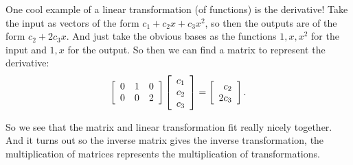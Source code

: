\begin{example}
  One cool example of a linear transformation (of functions) is the derivative! Take the input as vectors of the form $c_1 + c_2x + c_3x^2$, so then the outputs are of the form $c_2 + 2c_3x$. And just take the obvious bases as the functions $1,x,x^2$ for the input and $1,x$ for the output. So then we can find a matrix to represent the derivative:
\[ \left[ \begin{array}{rrrrrrrrrrrrrrrrrrrrrrrrr} 0&1&0\\0&0&2\\ \end{array} \right]\left[ \begin{array}{rrrrrrrrrrrrrrrrrrrrrrrrr} c_1\\c_2\\c_3\\ \end{array} \right] = \left[ \begin{array}{rrrrrrrrrrrrrrrrrrrrrrrrr} c_2\\2c_3\\ \end{array} \right]. \]
\end{example}

So we see that the matrix and linear transformation fit really nicely together. And it turns out so the inverse matrix gives the inverse transformation, the multiplication of matrices represents the multiplication of transformations. 